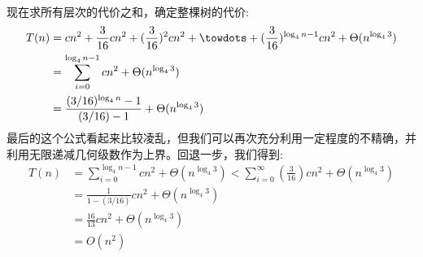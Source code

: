 \documentclass[a4paper,11pt]{article}
\begin{document}
\paragraph*{}现在求所有层次的代价之和，确定整棵树的代价:
\begin{equation}
	\begin{split}
		T(n)&=cn^2+\frac{3}{16}cn^2+(\frac{3}{16})^2cn^2+\towdots+(\frac{3}{16})^{\log_{4}{n}-1}cn^2+\Theta(n^{\log_{4}{3}})\\
		&=\sum_{i=0}^{\log_{4}{n}-1}cn^2+\Theta(n^{\log_{4}{3}})\\
		&=\frac{(3/16)^{\log_{4}{n}}-1}{(3/16)-1}+\Theta(n^{\log_{4}{3}})
	\end{split}
\end{equation}
最后的这个公式看起来比较凌乱，但我们可以再次充分利用一定程度的不精确，并利用无限递减几何级数作为上界。回退一步，我们得到:
\begin{equation}
	\begin{split}
		T(n)&=\sum_{i=0}^{\log_{4}{n}-1}cn^2+\Theta(n^{\log_{4}{3}})<\sum_{i=0}^{\infty}(\frac{3}{16})cn^2+\Theta(n^{\log_{4}{3}})\\
		&=\frac{1}{1-(3/16)}cn^2+\Theta(n^{\log_{4}{3}})\\
		&=\frac{16}{13}cn^2 + \Theta(n^{\log_{4}{3}})\\
		&=O(n^2)
	\end{split}
\end{equation}
\end{document}
